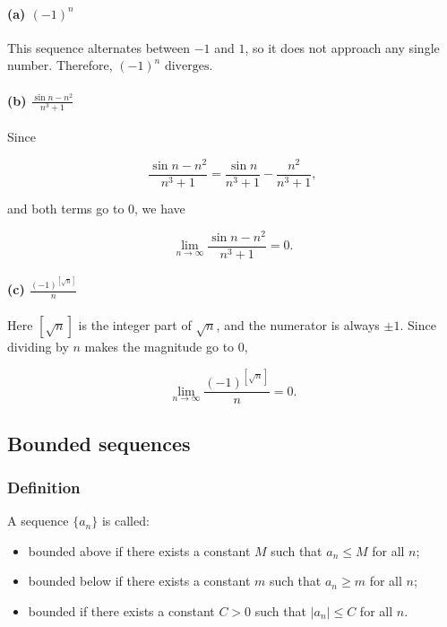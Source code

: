 \documentclass[11pt,a4paper]{article}
\begin{document}
\paragraph{\texorpdfstring{(a) \((-1)^n\)}{(a) (-1)\^{}n}}\label{a--1n}

This sequence alternates between \(-1\) and \(1\), so it does not
approach any single number. Therefore, \((-1)^n\text{ diverges.}\)

\paragraph{\texorpdfstring{(b)
\(\displaystyle \frac{\sin n-n^2}{n^3+1}\)}{(b) \textbackslash displaystyle \textbackslash frac\{\textbackslash sin n-n\^{}2\}\{n\^{}3+1\}}}\label{b-displaystyle-fracsin-n-n2n31}

Since

\[
\frac{\sin n-n^2}{n^3+1}
=
\frac{\sin n}{n^3+1}-\frac{n^2}{n^3+1},
\]

and both terms go to \(0\), we have

\[
\lim_{n\to\infty}\frac{\sin n-n^2}{n^3+1}=0.
\]

\paragraph{\texorpdfstring{(c)
\(\displaystyle \frac{(-1)^{[\sqrt n]}}{n}\)}{(c) \textbackslash displaystyle \textbackslash frac\{(-1)\^{}\{{[}\textbackslash sqrt n{]}\}\}\{n\}}}\label{c-displaystyle-frac-1sqrt-nn}

Here \([\sqrt n]\) is the integer part of \(\sqrt n\), and the numerator
is always \(\pm1\). Since dividing by \(n\) makes the magnitude go to
\(0\),

\[
\lim_{n\to\infty}\frac{(-1)^{[\sqrt n]}}{n}=0.
\]

\subsection{Bounded sequences}\label{bounded-sequences}

\subsubsection{Definition}\label{definition}

A sequence \(\{a_n\}\) is called:

\begin{itemize}
\item
  bounded above if there exists a constant \(M\) such that \(a_n\le M\)
  for all \(n\);
\item
  bounded below if there exists a constant \(m\) such that \(a_n\ge m\)
  for all \(n\);
\item
  bounded if there exists a constant \(C>0\) such that \(|a_n|\le C\)
  for all \(n\).
\end{itemize}
\end{document}
